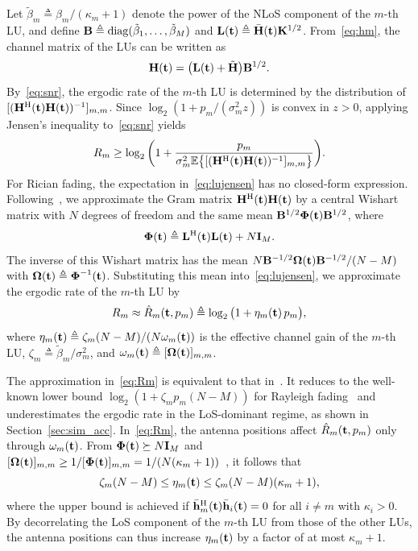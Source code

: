 \documentclass[journal]{IEEEtran}
\begin{document}
Let $\tilde\beta_m\triangleq\beta_m/(\kappa_m+1)$ denote the power of the NLoS component of the $m$-th LU, and define $\mathbf{B}\triangleq\mathrm{diag}(\tilde\beta_1,\ldots,\tilde\beta_M)$ and $\mathbf{L}(\mathbf{t})\triangleq\bar{\mathbf{H}}(\mathbf{t})\mathbf{K}^{1/2}$. From~\eqref{eq:hm}, the channel matrix of the LUs can be written as
\begin{equation}\label{eq:Hdecomp}
\mathbf{H}(\mathbf{t})=\big(\mathbf{L}(\mathbf{t})+\tilde{\mathbf{H}}\big)\mathbf{B}^{1/2}.
\end{equation}
By~\eqref{eq:snr}, the ergodic rate of the $m$-th LU is determined by the distribution of $[(\mathbf{H}^{\mathrm H}(\mathbf{t})\mathbf{H}(\mathbf{t}))^{-1}]_{m,m}$. Since $\log_2(1+p_m/(\sigma_m^2z))$ is convex in $z>0$, applying Jensen's inequality to~\eqref{eq:snr} yields
\begin{equation}\label{eq:lujensen}
R_m\ge\log_2\bigg(1+\frac{p_m}{\sigma_m^2\mathbb{E}\big\{[(\mathbf{H}^{\mathrm H}(\mathbf{t})\mathbf{H}(\mathbf{t}))^{-1}]_{m,m}\big\}}\bigg).
\end{equation}
For Rician fading, the expectation in~\eqref{eq:lujensen} has no closed-form expression. Following~\cite{ZhangJSTSP2014}, we approximate the Gram matrix $\mathbf{H}^{\mathrm H}(\mathbf{t})\mathbf{H}(\mathbf{t})$ by a central Wishart matrix with $N$ degrees of freedom and the same mean $\mathbf{B}^{1/2}\boldsymbol{\Phi}(\mathbf{t})\mathbf{B}^{1/2}$, where
\begin{equation}\label{eq:Phi}
\boldsymbol{\Phi}(\mathbf{t})\triangleq\mathbf{L}^{\mathrm H}(\mathbf{t})\mathbf{L}(\mathbf{t})+N\mathbf{I}_M.
\end{equation}
The inverse of this Wishart matrix has the mean $N\mathbf{B}^{-1/2}\boldsymbol{\Omega}(\mathbf{t})\mathbf{B}^{-1/2}/(N-M)$ with $\boldsymbol{\Omega}(\mathbf{t})\triangleq\boldsymbol{\Phi}^{-1}(\mathbf{t})$. Substituting this mean into~\eqref{eq:lujensen}, we approximate the ergodic rate of the $m$-th LU by
\begin{equation}\label{eq:Rm}
R_m\approx\hat R_m(\mathbf{t},p_m)\triangleq\log_2\big(1+\eta_m(\mathbf{t})\,p_m\big),
\end{equation}
where $\eta_m(\mathbf{t})\triangleq\zeta_m(N-M)/(N\omega_m(\mathbf{t}))$ is the effective channel gain of the $m$-th LU, $\zeta_m\triangleq\tilde\beta_m/\sigma_m^2$, and $\omega_m(\mathbf{t})\triangleq[\boldsymbol{\Omega}(\mathbf{t})]_{m,m}$.

The approximation in~\eqref{eq:Rm} is equivalent to that in~\cite[Sec.~IV-A]{ZhengTCOM2025}. It reduces to the well-known lower bound $\log_2(1+\zeta_mp_m(N-M))$ for Rayleigh fading~\cite{Ngo2013} and underestimates the ergodic rate in the LoS-dominant regime, as shown in Section~\ref{sec:sim_acc}. In~\eqref{eq:Rm}, the antenna positions affect $\hat R_m(\mathbf{t},p_m)$ only through $\omega_m(\mathbf{t})$. From $\boldsymbol{\Phi}(\mathbf{t})\succeq N\mathbf{I}_M$ and $[\boldsymbol{\Omega}(\mathbf{t})]_{m,m}\ge1/[\boldsymbol{\Phi}(\mathbf{t})]_{m,m}=1/(N(\kappa_m+1))$~\cite{Horn2013}, it follows that
\begin{equation}\label{eq:etabound}
\zeta_m(N-M)\le\eta_m(\mathbf{t})\le\zeta_m(N-M)(\kappa_m+1),
\end{equation}
where the upper bound is achieved if $\bar{\mathbf{h}}_m^{\mathrm H}(\mathbf{t})\bar{\mathbf{h}}_i(\mathbf{t})=0$ for all $i\neq m$ with $\kappa_i>0$. By decorrelating the LoS component of the $m$-th LU from those of the other LUs, the antenna positions can thus increase $\eta_m(\mathbf{t})$ by a factor of at most $\kappa_m+1$.
\end{document}
